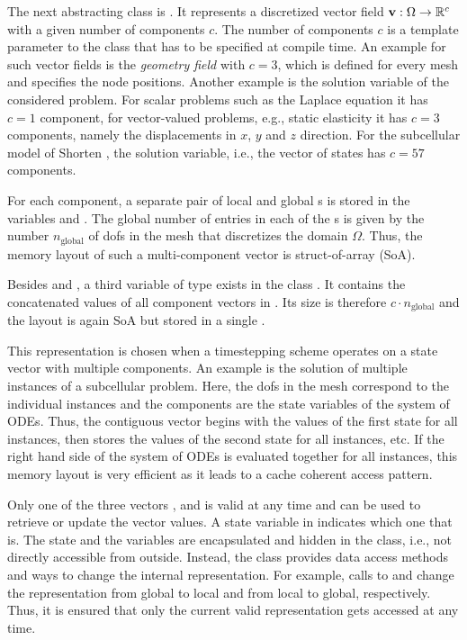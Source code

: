 The next abstracting class is . It represents a discretized vector field $\textbf{v} : \Omega \to \mathbb{R}^c$ with a given number of components $c$. The number of components $c$ is a template parameter to the class that has to be specified at compile time. 
An example for such vector fields is the \emph{geometry field} with $c=3$, which is defined for every mesh and specifies the node positions. Another example is the solution variable of the considered problem. For scalar problems such as the Laplace equation it has $c=1$ component, for vector-valued problems, e.g., static elasticity it has $c=3$ components, namely the displacements in $x$, $y$ and $z$ direction. For the subcellular model of Shorten \cite{Shorten2007}, the solution variable, i.e., the vector of states has $c=57$ components.

For each component, a separate pair of local and global \Vec{}s is stored in the variables  and . The global number of entries in each of the \Vec{}s is given by the number $n_\text{global}$ of dofs in the mesh that discretizes the domain $\Omega$. Thus, the memory layout of such a multi-component vector is struct-of-array (SoA). 

Besides  and , a third variable  of type \Vec{} exists in the class . It contains the concatenated values of all component vectors in . Its size is therefore $c\cdot n_\text{global}$ and the layout is again SoA but stored in a single \Vec{}.

This representation is chosen when a timestepping scheme operates on a state vector with multiple components. An example is the solution of multiple instances of a subcellular problem. Here, the dofs in the mesh correspond to the individual instances and the components are the state variables of the system of ODEs. Thus, the contiguous vector begins with the values of the first state for all instances, then stores the values of the second state for all instances, etc. If the right hand side of the system of ODEs is evaluated together for all instances, this memory layout is very efficient as it leads to a cache coherent access pattern.

Only one of the three vectors ,  and  is valid at any time and can be used to retrieve or update the vector values. 
A state variable  in  indicates which one that is. The state and the \Vec{} variables are encapsulated and hidden in the class, i.e., not directly accessible from outside. Instead, the class provides data access methods and ways to change the internal representation. For example, calls to  and  change the representation from global to local and from local to global, respectively.
Thus, it is ensured that only the current valid representation gets accessed at any time.

